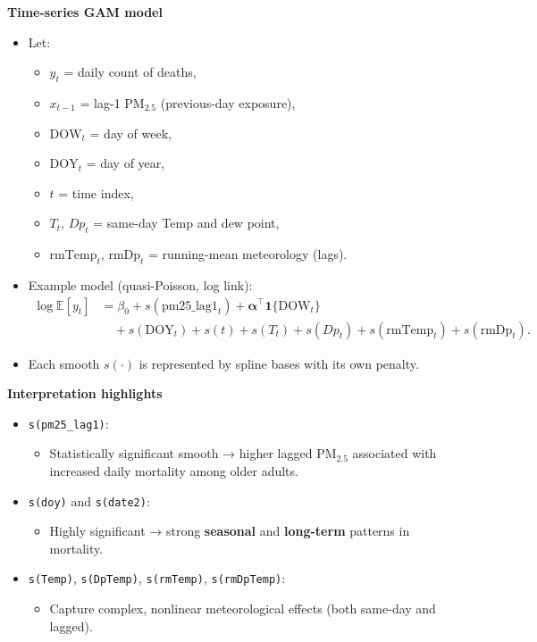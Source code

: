 \documentclass[
  letterpaper,
  DIV=11,
  numbers=noendperiod]{scrreprt}
\providecommand{\tightlist}{%
  \setlength{\itemsep}{0pt}\setlength{\parskip}{0pt}}\usepackage{longtable,booktabs,array}
\begin{document}
\textbf{Time-series GAM model}

\begin{itemize}
\tightlist
\item
  Let:

  \begin{itemize}
  \tightlist
  \item
    \(y_t\) = daily count of deaths,
  \item
    \(x_{t-1}\) = lag-1 PM\(_{2.5}\) (previous-day exposure),
  \item
    \(\text{DOW}_t\) = day of week,
  \item
    \(\text{DOY}_t\) = day of year,
  \item
    \(t\) = time index,
  \item
    \(T_t\), \(Dp_t\) = same-day Temp and dew point,
  \item
    \(\text{rmTemp}_t\), \(\text{rmDp}_t\) = running-mean meteorology
    (lags).
  \end{itemize}
\item
  Example model (quasi-Poisson, log link): \[
  \begin{aligned}
  \log \mathbb{E}[y_t]
  &= \beta_0 + s(\text{pm25\_lag1}_t)
   + \boldsymbol{\alpha}^\top \mathbf{1}\{\text{DOW}_t\} \\
  &\quad + s(\text{DOY}_t)
   + s(t)
   + s(T_t) + s(Dp_t)
   + s(\text{rmTemp}_t) + s(\text{rmDp}_t).
  \end{aligned}
  \]
\item
  Each smooth \(s(\cdot)\) is represented by spline bases with its own
  penalty.
\end{itemize}

\textbf{Interpretation highlights}

\begin{itemize}
\tightlist
\item
  \texttt{s(pm25\_lag1)}:

  \begin{itemize}
  \tightlist
  \item
    Statistically significant smooth → higher lagged PM\(_{2.5}\)
    associated with increased daily mortality among older adults.
  \end{itemize}
\item
  \texttt{s(doy)} and \texttt{s(date2)}:

  \begin{itemize}
  \tightlist
  \item
    Highly significant → strong \textbf{seasonal} and \textbf{long-term}
    patterns in mortality.
  \end{itemize}
\item
  \texttt{s(Temp)}, \texttt{s(DpTemp)}, \texttt{s(rmTemp)},
  \texttt{s(rmDpTemp)}:

  \begin{itemize}
  \tightlist
  \item
    Capture complex, nonlinear meteorological effects (both same-day and
    lagged).
  \end{itemize}
\end{itemize}
\end{document}
